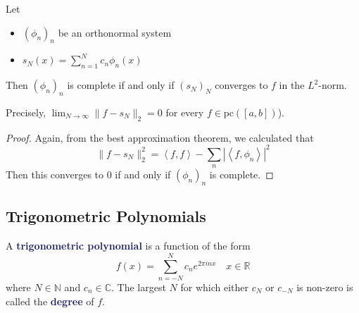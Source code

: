 \documentclass[11pt]{article}
\numberwithin{equation}{section}
\newcommand{\navy}[1]{\textcolor{MidnightBlue}{\bf #1}}
\theoremstyle{definition}
\theoremstyle{definition}
\newcommand\angles[1]{\left\langle #1 \right\rangle}
\newcommand\abs[1]{\left| #1 \right|}
\newcommand\norm[1]{\lVert#1\rVert}
\newcommand{\1}{\mathbbm 1}
\newcommand{\CC}{\mathbb C}
\newcommand{\RR}{\mathbb R}
\newcommand{\NN}{\mathbb N}
\begin{document}
\begin{theorem}[]
	Let
	\begin{itemize}
		\item $(\phi_n)_n$ be an orthonormal system 
		\item $s_N(x) = \sum_{n=1}^N c_n \phi_n(x)$
	\end{itemize}
	Then $(\phi_n)_n$ is complete if and only if $(s_N)_N$ converges to $f$ in the $L^2$-norm. 

	Precisely, $\lim_{N \to \infty} \norm{f - s_N}_2 = 0$ for every $f \in \text{pc}([a,b])$). 
\end{theorem}

\begin{proof}
	Again, from the best approximation theorem, we calculated that
	\begin{equation}
		\norm{f - s_N}^2_2 = \angles{f,f} - \sum_{n} \abs{\angles{f,\phi_n}}^2 
	\end{equation}
	Then this converges to $0$ if and only if $(\phi_n)_n$ is complete.
\end{proof}



\subsection{Trigonometric Polynomials}

\begin{definition}
	A \navy{trigonometric polynomial} is a function of the form
	\begin{equation}
		f(x) = \sum_{n=-N}^N c_n e^{2\pi i n x} \quad x \in \RR
	\end{equation}
	where $N \in \NN$ and $c_n \in \CC$. The largest $N$ for which either $c_N$ or $c_{-N}$ is non-zero is called the \navy{degree} of $f$. 
\end{definition}
\end{document}
